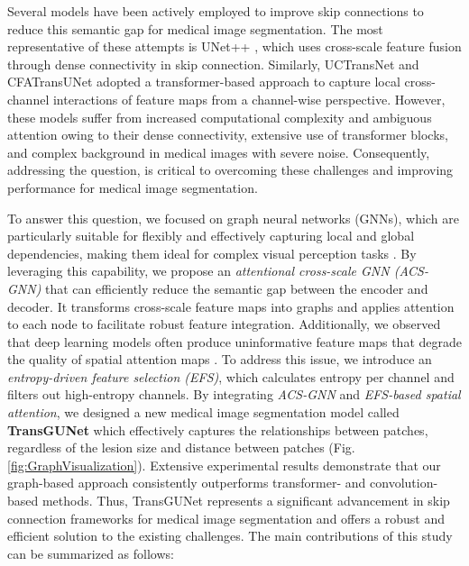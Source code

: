 Several models have been actively employed to improve skip connections to reduce this semantic gap for medical image segmentation. The most representative of these attempts is UNet++ \cite{zhou2018unet++}, which uses cross-scale feature fusion through dense connectivity in skip connection. Similarly, UCTransNet \cite{wang2022uctransnet}  and CFATransUNet \cite{wang2024cfatransunet} adopted a transformer-based approach to capture local cross-channel interactions of feature maps from a channel-wise perspective. However, these models suffer from increased computational complexity and ambiguous attention owing to their dense connectivity, extensive use of transformer blocks, and complex background in medical images with severe noise. Consequently, addressing the question,  is critical to overcoming these challenges and improving performance for medical image segmentation.

To answer this question, we focused on graph neural networks (GNNs), which are particularly suitable for flexibly and effectively capturing local and global dependencies, making them ideal for complex visual perception tasks \cite{han2022vision}. By leveraging this capability, we propose an \textit{attentional cross-scale GNN (ACS-GNN)} that can efficiently reduce the semantic gap between the encoder and decoder. It transforms cross-scale feature maps into graphs and applies attention to each node to facilitate robust feature integration. Additionally, we observed that deep learning models often produce uninformative feature maps that degrade the quality of spatial attention maps \cite{chen2021lesion, shawn2024ct}. To address this issue, we introduce an \textit{entropy-driven feature selection (EFS)}, which calculates entropy per channel and filters out high-entropy channels. By integrating \textit{ACS-GNN} and \textit{EFS-based spatial attention}, we designed a new medical image segmentation model called \textbf{TransGUNet} which effectively captures the relationships between patches, regardless of the lesion size and distance between patches (Fig. \ref{fig:GraphVisualization}). Extensive experimental results demonstrate that our graph-based approach consistently outperforms transformer- and convolution-based methods. Thus, TransGUNet represents a significant advancement in skip connection frameworks for medical image segmentation and offers a robust and efficient solution to the existing challenges. The main contributions of this study can be summarized as follows:

